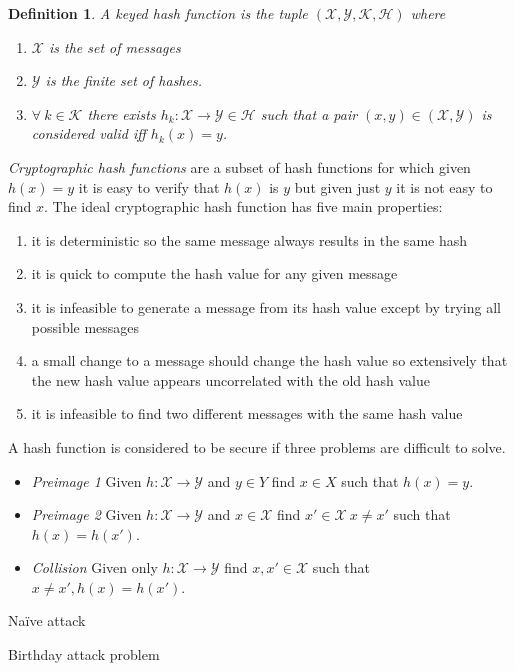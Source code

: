 \documentclass{article}
\theoremstyle{quest}
\newtheorem*{definition}{Definition}
\newcommand{\Hsh}{\mathcal{H}}
\newcommand{\K}{\mathcal{K}}
\newcommand{\X}{\mathcal{X}}
\newcommand{\Y}{\mathcal{Y}}
\begin{document}
\begin{definition}
	A \textit{keyed hash function} is the tuple $(\X,\Y,\K,\Hsh)$ where
	\begin{enumerate}
		\item $\X$ is the set of messages
		\item $\Y$ is the finite set of hashes.
		\item $\forall\ k \in \K$ there exists $h_k : \X \rightarrow \Y \in \Hsh$
			such that a pair $(x,y) \in (\X, \Y)$ is considered valid iff $h_k(x) = y$.
	\end{enumerate}
\end{definition}

\textit{Cryptographic hash functions} are a subset of hash functions
for which given $h(x) = y$ it is easy to verify that $h(x)$ is $y$
but given just $y$ it is not easy to find $x$.
The ideal cryptographic hash function has five main properties:
\begin{enumerate}
	\item it is deterministic so the same message always results in the same hash
	\item it is quick to compute the hash value for any given message
	\item it is infeasible to generate a message from its hash value except by trying all possible messages
	\item a small change to a message should change the hash value so extensively that the new hash value appears uncorrelated with the old hash value
	\item it is infeasible to find two different messages with the same hash value
\end{enumerate}
A hash function is considered to be secure if three problems are difficult to solve.
\begin{itemize}
	\item \textit{Preimage 1}
		Given $h : \X \rightarrow \Y$
		and $y \in Y$
		find $x \in X$
		such that $h(x) = y$.
	\item \textit{Preimage 2}
		Given $h : \X \rightarrow \Y$
		and $x \in \X$
		find $x\prime \in \X\ x \neq x\prime$
		such that $h(x) = h(x\prime)$.
	\item \textit{Collision}
		Given only $h : \X \rightarrow \Y$
		find $x, x\prime \in \X$
		such that $x \neq x\prime, h(x) = h(x\prime)$.
\end{itemize}

Na\"ive attack

Birthday attack problem
\end{document}

